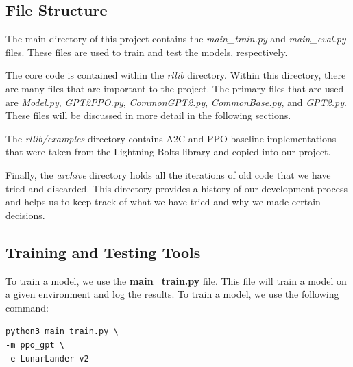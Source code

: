 
\subsection{File Structure}

The main directory of this project contains the \textit{main\_train.py} and \textit{main\_eval.py} files. These files are used to train and test the models, respectively.

The core code is contained within the \textit{rllib} directory. Within this directory, there are many files that are important to the project. The primary files that are used are \textit{Model.py}, \textit{GPT2PPO.py}, \textit{CommonGPT2.py}, \textit{CommonBase.py}, and \textit{GPT2.py}. These files will be discussed in more detail in the following sections.

The \textit{rllib/examples} directory contains A2C and PPO baseline implementations that were taken from the Lightning-Bolts library and copied into our project.

Finally, the \textit{archive} directory holds all the iterations of old code that we have tried and discarded. This directory provides a history of our development process and helps us to keep track of what we have tried and why we made certain decisions.


\subsection{Training and Testing Tools}
To train a model, we use the \textbf{main\_train.py} file. This file will train a model on a given environment and log the results.
To train a model, we use the following command:
\begin{center}
    \texttt{python3 main\_train.py \textbackslash \\}
    \texttt{-m ppo\_gpt \textbackslash \\}
    \texttt{-e LunarLander-v2}
\end{center}

